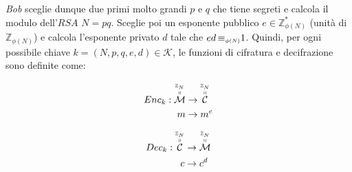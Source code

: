 \documentclass[twoside,symmetric,justified,openany,nobib]{tufte-book}
\newcommand{\veq}{\mathrel{\rotatebox{60}{$=$}}}
\newcommand{\vneq}{\mathrel{\rotatebox{45}{$\neq$}}}
\newcommand{\VerticalRelations}[3]{
  \adjustbox{stack=r}{
    \ensuremath{#2}\\
    \ensuremath{\mathclap{#3}}\\
    \ensuremath{#1}\\
  }
}
\newcommand{\B}{\textit{Bob}\xspace}
\begin{document}
\B sceglie dunque due primi molto grandi $p$ e $q$ che tiene segreti e calcola il modulo dell'$RSA$ $N{=}pq$. Sceglie poi un esponente pubblico $e{\in}\mathbb{Z}^{*}_{\phi(N)}$ (unità di $\mathbb{Z}_{\phi(N)}$) e calcola l'esponente privato $d$ tale che $ed\,{\equiv}_{\text{\tiny $\phi(N)$}}1$. Quindi, per ogni possibile chiave $k{=}(N,p,q,e,d){\in}\mathcal{K}$, le funzioni di cifratura e decifrazione sono definite come:

\begin{minipage}[b]{0.45\linewidth}
  \center
  \[
    \begin{split}
      Enc_k:\overset{\overset{\mathbb{Z}_\text{\tiny $N$}}{\shortparallel}}{\mathcal{M}} &\rightarrow \overset{\overset{\mathbb{Z}_\text{\tiny $N$}}{\shortparallel}}{\mathcal{C}}\\
      m &\rightarrow m^e
    \end{split}
  \]
\end{minipage}
\begin{minipage}[b]{0.45\linewidth}
  \center
  \[
    \begin{split}
      Dec_k:\overset{\overset{\mathbb{Z}_\text{\tiny $N$}}{\shortparallel}}{\mathcal{C}} &\rightarrow \overset{\overset{\mathbb{Z}_\text{\tiny $N$}}{\shortparallel}}{\mathcal{M}}\\
      c &\rightarrow c^d
    \end{split}
  \]
\end{minipage}



\end{document}
